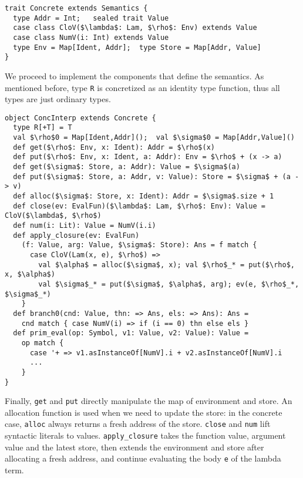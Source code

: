 \begin{lstlisting}
trait Concrete extends Semantics {
  type Addr = Int;   sealed trait Value
  case class CloV($\lambda$: Lam, $\rho$: Env) extends Value
  case class NumV(i: Int) extends Value
  type Env = Map[Ident, Addr];  type Store = Map[Addr, Value]
}
\end{lstlisting}

We proceed to implement the components that define the semantics. As mentioned
before, type \texttt{R} is concretized as an identity type function, thus all
types are just ordinary types.

\begin{lstlisting}
object ConcInterp extends Concrete {
  type R[+T] = T
  val $\rho$0 = Map[Ident,Addr]();  val $\sigma$0 = Map[Addr,Value]()
  def get($\rho$: Env, x: Ident): Addr = $\rho$(x)
  def put($\rho$: Env, x: Ident, a: Addr): Env = $\rho$ + (x -> a)
  def get($\sigma$: Store, a: Addr): Value = $\sigma$(a)
  def put($\sigma$: Store, a: Addr, v: Value): Store = $\sigma$ + (a -> v)
  def alloc($\sigma$: Store, x: Ident): Addr = $\sigma$.size + 1
  def close(ev: EvalFun)($\lambda$: Lam, $\rho$: Env): Value = CloV($\lambda$, $\rho$)
  def num(i: Lit): Value = NumV(i.i)
  def apply_closure(ev: EvalFun)
    (f: Value, arg: Value, $\sigma$: Store): Ans = f match {
      case CloV(Lam(x, e), $\rho$) =>
        val $\alpha$ = alloc($\sigma$, x); val $\rho$_* = put($\rho$, x, $\alpha$)
        val $\sigma$_* = put($\sigma$, $\alpha$, arg); ev(e, $\rho$_*, $\sigma$_*)
    }
  def branch0(cnd: Value, thn: => Ans, els: => Ans): Ans = 
    cnd match { case NumV(i) => if (i == 0) thn else els }
  def prim_eval(op: Symbol, v1: Value, v2: Value): Value = 
    op match {
      case '+ => v1.asInstanceOf[NumV].i + v2.asInstanceOf[NumV].i
      ...
    }
}
\end{lstlisting}

Finally, \texttt{get} and \texttt{put} directly manipulate the map of
environment and store. An allocation function is used when we need to update the
store: in the concrete case, \texttt{alloc} always returns a fresh address of
the store. \texttt{close} and \texttt{num} lift syntactic literals to values.
\texttt{apply\_closure} takes the function value, argument value and the latest
store, then extends the environment and store after allocating a fresh address,
and continue evaluating the body \texttt{e} of the lambda term.
